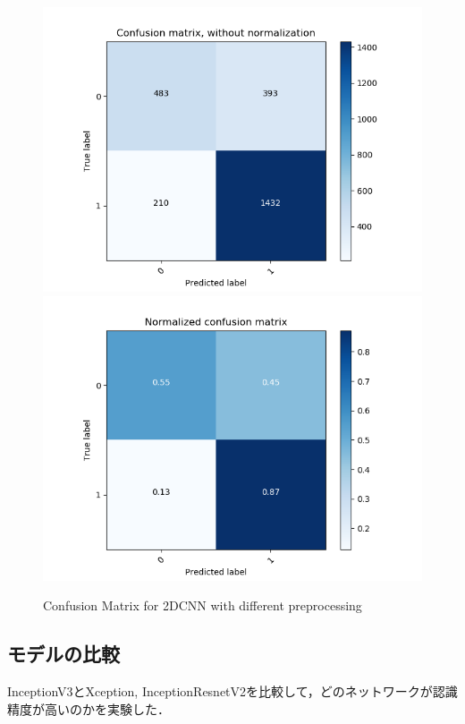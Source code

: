 \begin{figure}[H]
	\begin{minipage}[b]{\columnwidth}
		\centering
		\includegraphics[clip, width=0.45\linewidth]{fig/chapter4/count_pretrain_True_he_True}
		\includegraphics[clip, width=0.45\linewidth]{fig/chapter4/pretrain_True_he_True}
		\label{fig:pretrain_preprocess}
	\end{minipage}
	
	\caption{Confusion Matrix for 2DCNN with different preprocessing}
	\label{fig:2d_preprocess_matrix}
	
\end{figure}


\subsection*{モデルの比較}
InceptionV3とXception, InceptionResnetV2を比較して，どのネットワークが認識精度が高いのかを実験した．

